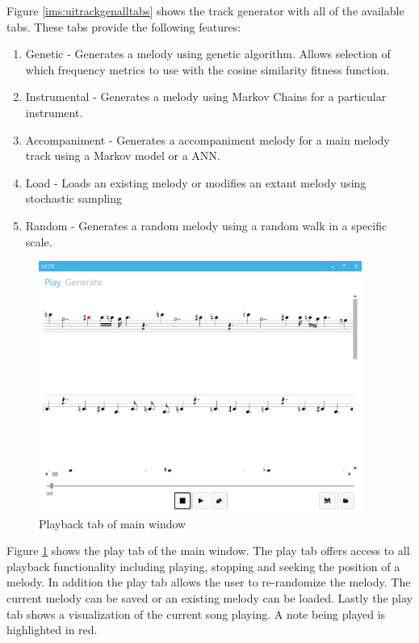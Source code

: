Figure \ref{ims:uitrackgenalltabs} shows the track generator with all of the available tabs.
These tabs provide the following features:
\begin{enumerate}
\item Genetic - Generates a melody using genetic algorithm. Allows selection of which frequency metrics to use with the cosine similarity fitness function.
\item Instrumental - Generates a melody using Markov Chains for a particular instrument.
\item Accompaniment - Generates a accompaniment melody for a main melody track using a Markov model or a \ac{ANN}.
\item Load - Loads an existing melody or modifies an extant melody using stochastic sampling
\item Random - Generates a random melody using a random walk in a specific scale.
\end{enumerate}

\begin{figure}
\centerline{\includegraphics[width=400px]{../images/res_ui_playback.png}}
\caption{Playback tab of main window}
\label{ims:res_ui_playback}
\end{figure}

Figure \ref{ims:res_ui_playback} shows the play tab of the main window. The play tab offers access to all playback functionality including playing, stopping and seeking the position of a melody.
In addition the play tab allows the user to re-randomize the melody. The current melody can be saved or an existing melody can be loaded.
Lastly the play tab shows a visualization of the current song playing. A note being played is highlighted in red.

